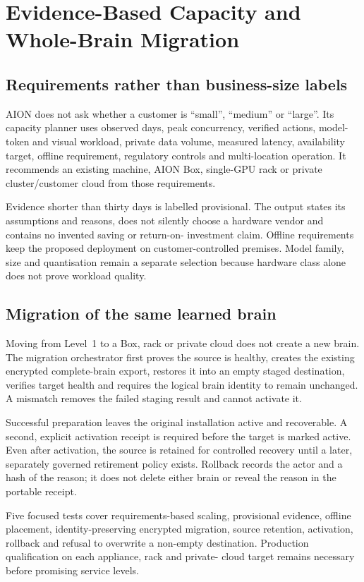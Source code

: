 \section{Evidence-Based Capacity and Whole-Brain Migration}

\subsection{Requirements rather than business-size labels}

AION does not ask whether a customer is ``small'', ``medium'' or ``large''. Its capacity planner
uses observed days, peak concurrency, verified actions, model-token and visual workload, private
data volume, measured latency, availability target, offline requirement, regulatory controls and
multi-location operation. It recommends an existing machine, AION Box, single-GPU rack or private
cluster/customer cloud from those requirements.

Evidence shorter than thirty days is labelled provisional. The output states its assumptions and
reasons, does not silently choose a hardware vendor and contains no invented saving or return-on-
investment claim. Offline requirements keep the proposed deployment on customer-controlled
premises. Model family, size and quantisation remain a separate selection because hardware class
alone does not prove workload quality.

\subsection{Migration of the same learned brain}

Moving from Level~1 to a Box, rack or private cloud does not create a new brain. The migration
orchestrator first proves the source is healthy, creates the existing encrypted complete-brain
export, restores it into an empty staged destination, verifies target health and requires the
logical brain identity to remain unchanged. A mismatch removes the failed staging result and
cannot activate it.

Successful preparation leaves the original installation active and recoverable. A second,
explicit activation receipt is required before the target is marked active. Even after activation,
the source is retained for controlled recovery until a later, separately governed retirement
policy exists. Rollback records the actor and a hash of the reason; it does not delete either brain
or reveal the reason in the portable receipt.

Five focused tests cover requirements-based scaling, provisional evidence, offline placement,
identity-preserving encrypted migration, source retention, activation, rollback and refusal to
overwrite a non-empty destination. Production qualification on each appliance, rack and private-
cloud target remains necessary before promising service levels.
